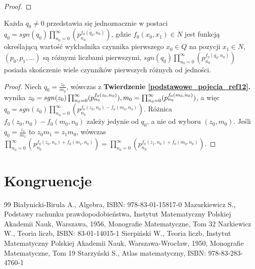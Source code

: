 \begin{appendices}
\begin{theorem}
\begin{proof}
\end{proof}
\end{theorem}
\begin{theorem}
Każda $q_0 \neq 0$ przedstawia się jednoznacznie w postaci $q_0 = sgn(q_0)\prod_{n_0 = 0}^{\infty}(p_{n_0}^{f_0(q_0, n_0)})$, gdzie $f_0(x_0, x_1) \in N$ jest funkcją określającą wartość wykładnika czynnika pierwszego $x_0 \in Q$ na pozycji $x_1 \in N$, $(p_0, p_1, ...)$ są różnymi liczbami pierwszymi, $sgn(q_0)\prod_{n_0 = 0}^{\infty}(p_{n_0}^{f_0(q_0, n_0)})$ posiada skończenie wiele czynników pierwszych różnych od jedności.
\begin{proof}
Niech $q_0 = \frac{z_0}{m_0}$, wówczas z \textbf{Twierdzenie \ref{podstawowe_pojecia_ref12}.} wynika $z_0 = sgn(z_0)\prod_{n_0 = 0}^{\infty}(p_{n_0}^{f_0(z_0, n_0)}),\\ m_0 = \prod_{n_0 = 0}^{\infty}(p_{n_0}^{f_0(m_0, n_0)})$, a więc $q_0 = sgn(z_0)\prod_{n_0 = 0}^{\infty}(p_{n_0}^{f_0(z_0, n_0) - f_0(m_0, n_0)})$. Różnica $f_0(z_0, n_0) - f_0(m_0, n_0)$ zależy jedynie od $q_0$, a nie od wyboru $(z_0, m_0)$. Jeśli $q_0 = \frac{z_1}{m_1}$ to $z_0m_1 = z_1m_0$, wówczas $\prod_{n_0 = 0}^{\infty}(p_{n_0}^{f_0(z_0, n_0) + f_0(m_1, n_0)}) = \prod_{n_0 = 0}^{\infty}(p_{n_0}^{f_0(z_1, n_0) + f_0(m_0, n_0)})$.
\end{proof}
\end{theorem}

\section{Kongruencje}

\end{appendices}

\begin{thebibliography}{99}
Białynicki-Birula A., Algebra, ISBN: 978-83-01-15817-0
Mazurkiewicz S., Podstawy rachunku prawdopodobieństwa, Instytut Matematyczny Polskiej Akademii Nauk, Warszawa, 1956, Monografie Matematyczne, Tom 32
Narkiewicz W., Teoria liczb, ISBN: 83-01-14015-1
Sierpiński W., Teoria liczb, Instytut Matematyczny Polskiej Akademii Nauk, Warszawa-Wrocław, 1950, Monografie Matematyczne, Tom 19
Starzyński S., Atlas matematyczny, ISBN: 978-83-283-4760-1
\end{thebibliography}

